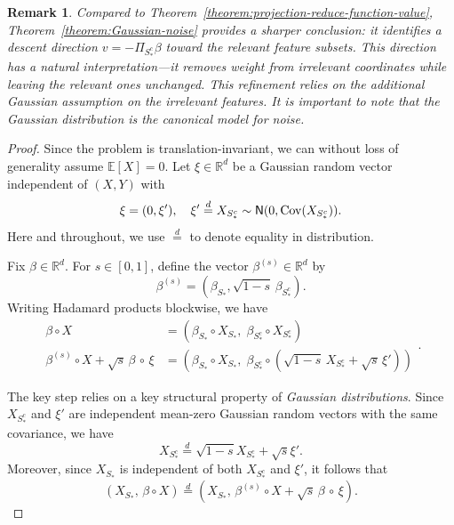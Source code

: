 \documentclass[sn-mathphys-num]{sn-jnl}%
\numberwithin{equation}{section}
\newcommand{\R}{\mathbb{R}}
\newcommand{\E}{\mathbb{E}}
\newcommand{\normal}{\mathsf{N}}  %
\newcommand{\Cov}{{\rm Cov}}
\theoremstyle{thmstyleone}%
\theoremstyle{thmstyletwo}%
\newtheorem{remark}{Remark}%
\theoremstyle{thmstylethree}%
\begin{document}
\vspace{.5em} 
\begin{remark}
\emph{
Compared to Theorem~\ref{theorem:projection-reduce-function-value}, Theorem~\ref{theorem:Gaussian-noise} provides a sharper conclusion: it identifies a descent direction $v = -\Pi_{S_*^c} \beta$ toward the relevant feature subsets. This direction has a natural interpretation---it removes weight from irrelevant coordinates while leaving the relevant ones unchanged. This refinement relies on the additional Gaussian assumption on the irrelevant features. It is important to note that the Gaussian distribution is the canonical model for noise.
}
\end{remark} 


\begin{proof} 
Since the problem is translation-invariant, we can without loss of generality assume 
$\E[X]=0$. 
Let $\xi \in \R^d$ be a Gaussian random vector independent of $(X, Y)$ with
\begin{equation*}
	\xi = (0, \xi'), \quad \xi' \stackrel{d}{=} X_{S_*^c} \sim \normal(0, \Cov(X_{S_*^c})).
\end{equation*} 
Here and throughout, we use $\stackrel{d}{=}$ to denote equality in distribution.

Fix $\beta \in \R^d$. For $s\in [0, 1]$, define the vector $\beta^{(s)} \in \R^d$ by 
\begin{equation*}
	\beta^{(s)} = (\beta_{S_*}, \sqrt{1-s} \,\beta_{S_*^c}).
\end{equation*} 
Writing Hadamard products blockwise, we have
\begin{equation*}
\begin{split} 
	\beta \circ X &= (\beta_{S_*} \circ X_{S_*},\; \beta_{S_*^c} \circ X_{S_*^c}) \\
	\beta^{(s)} \circ X + \sqrt{s}\, \beta\, \circ \,\xi &= (\beta_{S_*} \circ X_{S_*},\; \beta_{S_*^c} \circ (\sqrt{1-s} \, X_{S_*^c} + \sqrt{s}\, \xi'))
\end{split} .
\end{equation*}

The key step relies on a key structural property of \emph{Gaussian distributions}. Since $X_{S_*^c}$ and $\xi'$ are independent mean-zero Gaussian random vectors with the same covariance, we have
\begin{equation}
X_{S_*^c} \stackrel{d}{=} \sqrt{1-s} X_{S_*^c} + \sqrt{s} \xi'.
\end{equation} 
Moreover, since $X_{S_*}$ is independent of both $X_{S_*^c}$ and $\xi'$, it follows that
\begin{equation}
\label{eqn:equality-in-distribution}
	(X_{S_*}, \,\beta \circ X) \stackrel{d}{=} (X_{S_*}, \,\beta^{(s)} \circ X + \sqrt{s}\, \beta \,\circ\, \xi).
\end{equation} 


\end{proof}
\end{document}
